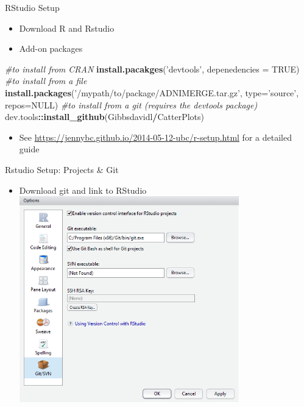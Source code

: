 \documentclass[
  ignorenonframetext,
]{beamer}
\newenvironment{Shaded}{\begin{snugshade}}{\end{snugshade}}
\newcommand{\CommentTok}[1]{\textcolor[rgb]{0.56,0.35,0.01}{\textit{#1}}}
\newcommand{\DataTypeTok}[1]{\textcolor[rgb]{0.13,0.29,0.53}{#1}}
\newcommand{\KeywordTok}[1]{\textcolor[rgb]{0.13,0.29,0.53}{\textbf{#1}}}
\newcommand{\NormalTok}[1]{#1}
\newcommand{\OperatorTok}[1]{\textcolor[rgb]{0.81,0.36,0.00}{\textbf{#1}}}
\newcommand{\OtherTok}[1]{\textcolor[rgb]{0.56,0.35,0.01}{#1}}
\newcommand{\StringTok}[1]{\textcolor[rgb]{0.31,0.60,0.02}{#1}}
\providecommand{\tightlist}{%
  \setlength{\itemsep}{0pt}\setlength{\parskip}{0pt}}
\begin{document}
\begin{frame}[fragile]{RStudio Setup}
\protect\hypertarget{rstudio-setup}{}

\begin{itemize}
\tightlist
\item
  Download R and Rstudio
\item
  Add-on packages
\end{itemize}

\begin{Shaded}
\begin{Highlighting}[]
\CommentTok{#to install from CRAN}
\KeywordTok{install.pacakges}\NormalTok{(}\StringTok{'devtools'}\NormalTok{, }\DataTypeTok{depenedencies =} \OtherTok{TRUE}\NormalTok{)}
\CommentTok{#to install from a file}
\KeywordTok{install.packages}\NormalTok{(}\StringTok{'/mypath/to/package/ADNIMERGE.tar.gz'}\NormalTok{, }
                 \DataTypeTok{type=}\StringTok{'source'}\NormalTok{, }\DataTypeTok{repos=}\OtherTok{NULL}\NormalTok{) }
\CommentTok{#to install from a git  (requires the devtools package)}
\NormalTok{dev.tools}\OperatorTok{::}\KeywordTok{install_github}\NormalTok{(Gibbsdavidl}\OperatorTok{/}\NormalTok{CatterPlots) }
\end{Highlighting}
\end{Shaded}

\begin{itemize}
\tightlist
\item
  See \url{https://jennybc.github.io/2014-05-12-ubc/r-setup.html} for a
  detailed guide
\end{itemize}

\end{frame}

\begin{frame}{Rstudio Setup: Projects \& Git}
\protect\hypertarget{rstudio-setup-projects-git}{}

\begin{itemize}
\tightlist
\item
  Download git and link to RStudio
  \includegraphics[width=0.75\textwidth,height=\textheight]{../external/images/setup_1_rstudio_git.PNG}
\end{itemize}

\end{frame}
\end{document}
